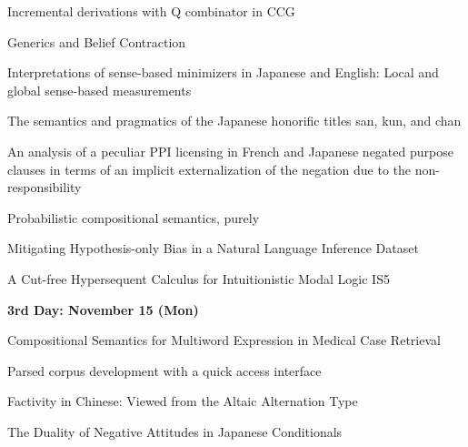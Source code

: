 \documentclass[12pt]{jarticle}
\begin{document}
      {Incremental derivations with Q combinator in CCG}
      {}
  
      {Generics and Belief Contraction}
      {}




  
      {Interpretations of sense-based minimizers in Japanese and English: Local and global sense-based measurements}
      {}
  
      {The semantics and pragmatics of the Japanese honorific titles san, kun, and chan}
      {}
  
      {An analysis of a peculiar PPI licensing in French and Japanese negated purpose clauses in terms of an implicit externalization of the negation due to the non-responsibility}
      {}




  
      {Probabilistic compositional semantics, purely}
      {}
  
      {Mitigating Hypothesis-only Bias in a Natural Language Inference Dataset}
      {}
  
      {A Cut-free Hypersequent Calculus for Intuitionistic Modal Logic IS5}
      {}




\noindent\textbf{\large 
3rd Day: November 15 (Mon)
}\\




  
      {Compositional Semantics for Multiword Expression in Medical Case Retrieval}
      {}
  
      {Parsed corpus development with a quick access interface}
      {}
  
      {Factivity in Chinese: Viewed from the Altaic Alternation Type}
      {}

  


  
      {The Duality of Negative Attitudes in Japanese Conditionals}
      {}
  
\end{document}
